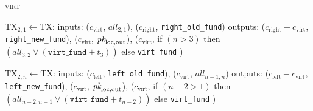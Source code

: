 \begin{center}
\begin{processbox}{\textsc{virt}}
\begin{algorithmic}[1]
          \State $\mathrm{TX}_{2, 1} \gets \mathrm{TX}$:
          \Indent
            \State inputs:
            \Indent
              \State ($c_{\mathrm{virt}}$, $\mathit{all}_{2, 1}$),
              \State ($c_{\mathrm{right}}$, \texttt{right\_old\_fund})
            \EndIndent
            \State outputs:
            \Indent
              \State ($c_{\mathrm{right}} - c_{\mathrm{virt}}$,
              \texttt{right\_new\_fund}),
              \State ($c_{\mathrm{virt}}$, $\textit{pk}_{\mathrm{loc}, \mathrm{out}}$),
              \State ($c_{\mathrm{virt}}$,
              \Indent
                \State if $(n > 3)$ then $(\mathit{all}_{3, 2}
                \vee (\texttt{virt\_fund} + t_3))$
                \State else \texttt{virt\_fund}
              \EndIndent
              \State )
            \EndIndent
          \EndIndent
        \EndIf

          \State $\mathrm{TX}_{2, n} \gets \mathrm{TX}$:
          \Indent
            \State inputs:
            \Indent
              \State ($c_{\mathrm{left}}$, \texttt{left\_old\_fund}),
              \State ($c_{\mathrm{virt}}$, $\mathit{all}_{n-1, n}$)
            \EndIndent
            \State outputs:
            \Indent
              \State ($c_{\mathrm{left}} - c_{\mathrm{virt}}$,
              \texttt{left\_new\_fund}),
              \State ($c_{\mathrm{virt}}$, $\textit{pk}_{\mathrm{loc}, \mathrm{out}}$),
              \State ($c_{\mathrm{virt}}$,
              \Indent
                \State if $(n-2 > 1)$ then $(\mathit{all}_{n-2, n-1} \vee
                (\texttt{virt\_fund} + t_{n-2}))$
                \State else \texttt{virt\_fund}
              \EndIndent
              \State )
            \EndIndent
          \EndIndent
        \EndIf


\end{algorithmic}
\end{processbox}
\end{center}
